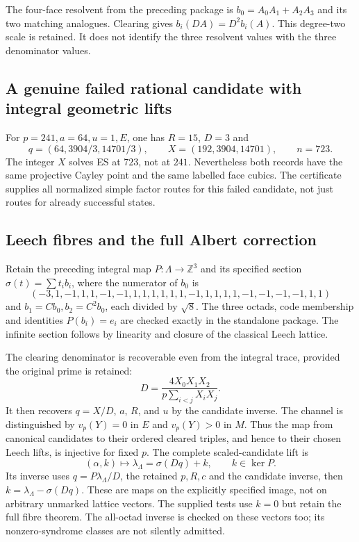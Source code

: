 \documentclass[11pt]{article}
\theoremstyle{definition}\newtheorem{definition}[theorem]{Definition}
\theoremstyle{remark}\newtheorem{remark}[theorem]{Remark}
\newcommand{\Z}{\mathbb Z}\newcommand{\Q}{\mathbb Q}\newcommand{\R}{\mathbb R}
\begin{document}
The four-face resolvent from the preceding package is
$b_0=A_0A_1+A_2A_3$ and its two matching analogues. Clearing gives
$b_i(DA)=D^2b_i(A)$. This degree-two scale is retained. It does not identify
the three resolvent values with the three denominator values.

\subsection{A genuine failed rational candidate with integral geometric lifts}
For $p=241,a=64,u=1,E$, one has $R=15$, $D=3$ and
\[
 q=(64,3904/3,14701/3),\qquad
 X=(192,3904,14701),\qquad n=723.
\]
The integer $X$ solves ES at $723$, not at $241$. Nevertheless both records
have the same projective Cayley point and the same labelled face cubics.
The certificate supplies all normalized simple factor routes for this failed
candidate, not just routes for already successful states.

\subsection{Leech fibres and the full Albert correction}
Retain the preceding integral map $P:\Lambda\to\Z^3$ and its specified
section $\sigma(t)=\sum t_i b_i$, where the numerator of $b_0$ is
\[
(-3,1,-1,1,1,-1,-1,1,1,1,1,1,1,-1,1,1,1,1,-1,-1,-1,-1,1,1)
\]
and $b_1=Cb_0,b_2=C^2b_0$, each divided by $\sqrt8$.
The three octads, code membership and identities $P(b_i)=e_i$ are checked
exactly in the standalone package. The infinite section follows by
linearity and closure of the classical Leech lattice.

The clearing denominator is recoverable even from the integral trace, provided
the original prime is retained:
\[
 D=\frac{4X_0X_1X_2}{p\sum_{i<j}X_iX_j}.
\]
It then recovers $q=X/D$, $a$, $R$, and $u$ by the candidate inverse.
The channel is distinguished by $v_p(Y)=0$ in $E$ and $v_p(Y)>0$ in $M$.
Thus the map from canonical candidates to their ordered cleared triples,
and hence to their chosen Leech lifts, is injective for fixed $p$.
The complete scaled-candidate lift is
\[
 (\alpha,k)\longmapsto \lambda_\Lambda=\sigma(Dq)+k,
 \qquad k\in\ker P.
\]
Its inverse uses $q=P\lambda_\Lambda/D$, the retained $p,R,c$ and the
candidate inverse, then $k=\lambda_\Lambda-\sigma(Dq)$.
These are maps on the explicitly specified image, not on arbitrary
unmarked lattice vectors. The supplied tests use $k=0$ but retain the
full fibre theorem. The all-octad inverse is checked on these vectors too;
its nonzero-syndrome classes are not silently admitted.
\end{document}
